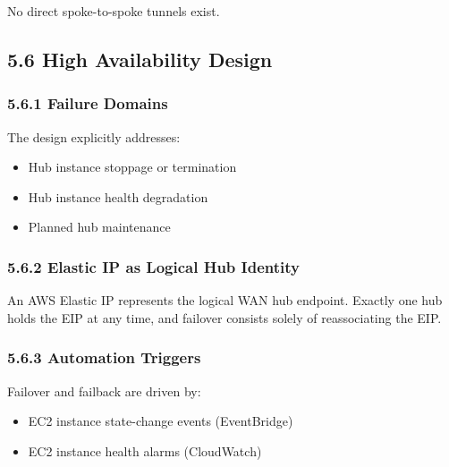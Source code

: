 \documentclass[11pt]{article}
\begin{document}
No direct spoke-to-spoke tunnels exist.

%
%
\subsection{5.6 High Availability Design}
\label{sec:ha-design}

\subsubsection{5.6.1 Failure Domains}
\label{sec:failure-domains}

The design explicitly addresses:

\begin{itemize}
  \item Hub instance stoppage or termination
  \item Hub instance health degradation
  \item Planned hub maintenance
\end{itemize}

\subsubsection{5.6.2 Elastic IP as Logical Hub Identity}
\label{sec:eip-identity}

An AWS Elastic IP represents the logical WAN hub endpoint. Exactly one hub holds the EIP at any time, and failover consists solely of reassociating the EIP.

\subsubsection{5.6.3 Automation Triggers}
\label{sec:ha-automation-triggers}

Failover and failback are driven by:

\begin{itemize}
  \item EC2 instance state-change events (EventBridge)
  \item EC2 instance health alarms (CloudWatch)
\end{itemize}
\end{document}
